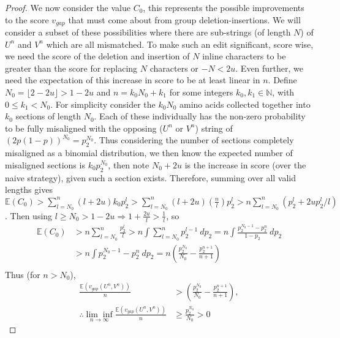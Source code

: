 \documentclass{article}
\begin{document}
\begin{proof}
We now consider the value $C_0$, this represents the possible improvements to the score $v_{gap}$ that must come about from group deletion-insertions. We will consider a subset of these possibilities where there are sub-strings (of length $N$) of $U^n$ and $V^n$ which are all mismatched. To make such an edit significant, score wise, we need the score of the deletion and insertion of $N$ inline characters to be greater than the score for replacing $N$ characters or $-N<2u$. Even further, we need the expectation of this increase in score to be at least linear in $n$. Define $N_0 = \lfloor 2-2u \rfloor > 1-2u $ and $n=k_0N_0 + k_1$ for some integers $k_0, k_1 \in \mathbb{N}$, with $0 \leq k_1 < N_0$. For simplicity consider the $k_0N_0$ amino acids collected together into $k_0$ sections of length $N_0$. Each of these individually has the non-zero probability to be fully misaligned with the opposing ($U^n$ or $V^n$) string of $(2p(1-p))^{N_0}=p_2^{N_0}$. Thus considering the number of sections completely misaligned as a binomial distribution, we then know the expected number of misaligned sections is $k_0 p_2^{N_0}$, then note $N_0+2u$ is the increase in score (over the naive strategy), given such a section exists. Therefore, summing over all valid lengths gives $\mathbb{E}(C_0) > \sum_{l=N_0}^n (l+2u)k_0p_2^{l} > \sum_{l=N_0}^n (l+2u)(\frac{n}{l})p_2^{l} > n \sum_{l=N_0}^n (p_2^{l}+2up_2^l / l)$. Then using $l\geq N_0>1-2u \Rightarrow 1+\frac{2u}{l}>\frac{1}{l} $, so 
\begin{equation*}
\begin{split}
\mathbb{E}(C_0) &> n \sum_{l=N_0}^n \frac{p_2^{l}}{l}> n \int \sum_{l=N_0}^n p_2^{l-1} \  dp_2 = n \int \frac{p_2^{N_0-1}-p_2^n}{1-p_2} \ dp_2 \\
&> n \int p_2^{N_0-1}-p_2^n \ dp_2 = n \left( \frac{p_2^{N_0}}{N_0} - \frac{p_2^{n+1}}{n+1} \right)\\
\end{split}
\end{equation*}
Thus (for $n>N_0$),
\begin{equation*}
\begin{split}
\frac{\mathbb{E} (v_{gap}(U^n,V^n))}{n} &> \left( \frac{p_2^{N_0}}{N_0} - \frac{p_2^{n+1}}{n+1} \right), \\ 
\therefore \underset{n \to \infty}{\lim \inf} \frac{\mathbb{E} (v_{gap}(U^n,V^n))}{n} & \geq \frac{p_2^{N_0}}{N_0} >0
\end{split}
\end{equation*}
\end{proof}
\end{document}
